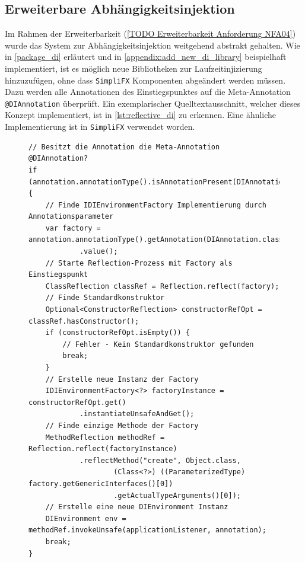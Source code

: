 \subsection{Erweiterbare Abhängigkeitsinjektion}
Im Rahmen der Erweiterbarkeit (\autoref{TODO Erweiterbarkeit Anforderung NFA04}) wurde das System zur Abhängigkeitsinjektion weitgehend abstrakt gehalten. Wie in \autoref{package_di} erläutert und in \autoref{appendix:add_new_di_library} beispielhaft implementiert, ist es möglich neue Bibliotheken zur Laufzeitinjizierung hinzuzufügen, ohne dass \texttt{SimpliFX} Komponenten abgeändert werden müssen. Dazu werden alle Annotationen des Einstiegspunktes auf die Meta-Annotation \texttt{@DIAnnotation} überprüft. Ein exemplarischer Quelltextausschnitt, welcher dieses Konzept implementiert, ist in \autoref{lst:reflective_di} zu erkennen. Eine ähnliche Implementierung ist in \texttt{SimpliFX} verwendet worden.
\begin{figure}[H]
	\centering
	\begin{lstlisting}[caption=Implementierung -- Abhängigkeitsinjektion., captionpos=b, label=lst:reflective_di, basicstyle={\scriptsize\ttfamily}]
// Besitzt die Annotation die Meta-Annotation @DIAnnotation?
if (annotation.annotationType().isAnnotationPresent(DIAnnotation.class)) {
	// Finde IDIEnvironmentFactory Implementierung durch Annotationsparameter
	var factory = annotation.annotationType().getAnnotation(DIAnnotation.class)
			.value();
	// Starte Reflection-Prozess mit Factory als Einstiegspunkt
	ClassReflection classRef = Reflection.reflect(factory);
	// Finde Standardkonstruktor
	Optional<ConstructorReflection> constructorRefOpt = classRef.hasConstructor();
	if (constructorRefOpt.isEmpty()) {
		// Fehler - Kein Standardkonstruktor gefunden
		break;
	}
	// Erstelle neue Instanz der Factory
	IDIEnvironmentFactory<?> factoryInstance = constructorRefOpt.get()
			.instantiateUnsafeAndGet();
	// Finde einzige Methode der Factory
	MethodReflection methodRef = Reflection.reflect(factoryInstance)
			.reflectMethod("create", Object.class, 
					(Class<?>) ((ParameterizedType) factory.getGenericInterfaces()[0])
					.getActualTypeArguments()[0]);
	// Erstelle eine neue DIEnvironment Instanz
	DIEnvironment env = methodRef.invokeUnsafe(applicationListener, annotation);
	break;
}
	\end{lstlisting}
\end{figure}